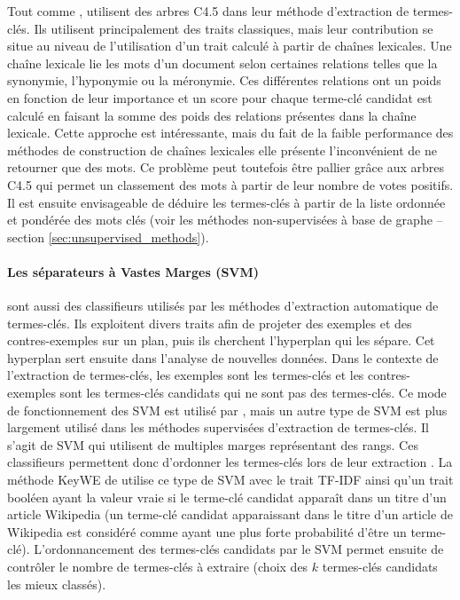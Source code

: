         Tout comme ,
         utilisent des arbres C4.5 dans leur
        méthode d'extraction de termes-clés. Ils utilisent principalement des
        traits classiques, mais leur contribution se situe au niveau de
        l'utilisation d'un trait calculé à partir de chaînes lexicales. Une
        chaîne lexicale lie les mots d'un document selon certaines relations
        telles que la synonymie, l'hyponymie ou la méronymie. Ces différentes
        relations ont un poids en fonction de leur importance et un score pour
        chaque terme-clé candidat est calculé en faisant la somme des poids
        des relations présentes dans la chaîne lexicale. Cette approche est
        intéressante, mais du fait de la faible performance des méthodes de
        construction de chaînes lexicales elle présente l'inconvénient de ne
        retourner que des mots. Ce problème peut toutefois être pallier grâce
        aux arbres C4.5 qui permet un classement des mots à partir de leur
        nombre de votes positifs. Il est ensuite envisageable de déduire les
        termes-clés à partir de la liste ordonnée et pondérée des mots clés
        (voir les méthodes non-supervisées à base de graphe -- section
        \ref{sec:unsupervised_methods}).

      \paragraph{Les séparateurs à Vastes Marges (SVM)}
        sont aussi des classifieurs utilisés par les méthodes d'extraction
        automatique de termes-clés. Ils exploitent divers traits afin de
        projeter des exemples et des contres-exemples sur un plan, puis ils
        cherchent l'hyperplan qui les sépare. Cet hyperplan sert ensuite dans
        l'analyse de nouvelles données. Dans le contexte de l'extraction de
        termes-clés, les exemples sont les termes-clés et les contres-exemples
        sont les termes-clés candidats qui ne sont pas des termes-clés. Ce
        mode de fonctionnement des SVM est utilisé par ,
        mais un autre type de SVM est plus largement utilisé dans les méthodes
        supervisées d'extraction de termes-clés. Il s'agit de SVM qui
        utilisent de multiples marges représentant des rangs. Ces classifieurs
        permettent donc d'ordonner les termes-clés lors de leur extraction
        \cite{herbrich1999svm, joachims2006linearsvm, jiang2009rankingsvm}.
        La méthode KeyWE de  utilise ce type de SVM
        avec le trait TF-IDF ainsi qu'un trait booléen ayant la valeur vraie
        si le terme-clé candidat apparaît dans un titre d'un article Wikipedia
        (un terme-clé candidat apparaissant dans le titre d'un article de
        Wikipedia est considéré comme ayant une plus forte probabilité d'être
        un terme-clé). L'ordonnancement des termes-clés candidats par le SVM
        permet ensuite de contrôler le nombre de termes-clés à extraire (choix
        des $k$ termes-clés candidats les mieux classés).

